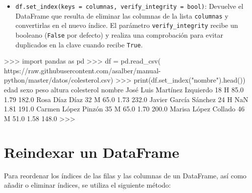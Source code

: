 \documentclass[
  spanish,
  a4paper,
]{scrreport}
\newenvironment{Shaded}{\begin{snugshade}}{\end{snugshade}}
\newcommand{\BuiltInTok}[1]{\textcolor[rgb]{0.00,0.23,0.31}{#1}}
\newcommand{\DecValTok}[1]{\textcolor[rgb]{0.68,0.00,0.00}{#1}}
\newcommand{\FloatTok}[1]{\textcolor[rgb]{0.68,0.00,0.00}{#1}}
\newcommand{\ImportTok}[1]{\textcolor[rgb]{0.00,0.46,0.62}{#1}}
\newcommand{\NormalTok}[1]{\textcolor[rgb]{0.00,0.23,0.31}{#1}}
\newcommand{\OperatorTok}[1]{\textcolor[rgb]{0.37,0.37,0.37}{#1}}
\newcommand{\StringTok}[1]{\textcolor[rgb]{0.13,0.47,0.30}{#1}}
\providecommand{\tightlist}{%
  \setlength{\itemsep}{0pt}\setlength{\parskip}{0pt}}
\begin{document}
\begin{itemize}
\tightlist
\item
  \texttt{df.set\_index(keys\ =\ columnas,\ verify\_integrity\ =\ bool)}:
  Devuelve el DataFrame que resulta de eliminar las columnas de la lista
  \texttt{columnas} y convertirlas en el nuevo índice. El parámetro
  \texttt{verify\_integrity} recibe un booleano (\texttt{False} por
  defecto) y realiza una comprobación para evitar duplicados en la clave
  cuando recibe \texttt{True}.
\end{itemize}

\begin{Shaded}
\begin{Highlighting}[]
\OperatorTok{\textgreater{}\textgreater{}\textgreater{}} \ImportTok{import}\NormalTok{ pandas }\ImportTok{as}\NormalTok{ pd}
\OperatorTok{\textgreater{}\textgreater{}\textgreater{}}\NormalTok{ df }\OperatorTok{=}\NormalTok{ pd.read\_csv(}
\StringTok{\textquotesingle{}https://raw.githubusercontent.com/asalber/manual{-}python/master/datos/colesterol.csv\textquotesingle{}}\NormalTok{)}
\OperatorTok{\textgreater{}\textgreater{}\textgreater{}} \BuiltInTok{print}\NormalTok{(df.set\_index(}\StringTok{"nombre"}\NormalTok{).head())}
\NormalTok{                              edad sexo  peso  altura  colesterol}
\NormalTok{nombre                                                           }
\NormalTok{José Luis Martínez Izquierdo    }\DecValTok{18}\NormalTok{    H  }\FloatTok{85.0}    \FloatTok{1.79}       \FloatTok{182.0}
\NormalTok{Rosa Díaz Díaz                  }\DecValTok{32}\NormalTok{    M  }\FloatTok{65.0}    \FloatTok{1.73}       \FloatTok{232.0}
\NormalTok{Javier García Sánchez           }\DecValTok{24}\NormalTok{    H   NaN    }\FloatTok{1.81}       \FloatTok{191.0}
\NormalTok{Carmen López Pinzón             }\DecValTok{35}\NormalTok{    M  }\FloatTok{65.0}    \FloatTok{1.70}       \FloatTok{200.0}
\NormalTok{Marisa López Collado            }\DecValTok{46}\NormalTok{    M  }\FloatTok{51.0}    \FloatTok{1.58}       \FloatTok{148.0}
\OperatorTok{\textgreater{}\textgreater{}\textgreater{}} 
\end{Highlighting}
\end{Shaded}

\section{Reindexar un DataFrame}\label{reindexar-un-dataframe}

Para reordenar los índices de las filas y las columnas de un DataFrame,
así como añadir o eliminar índices, se utiliza el siguiente método:
\end{document}
